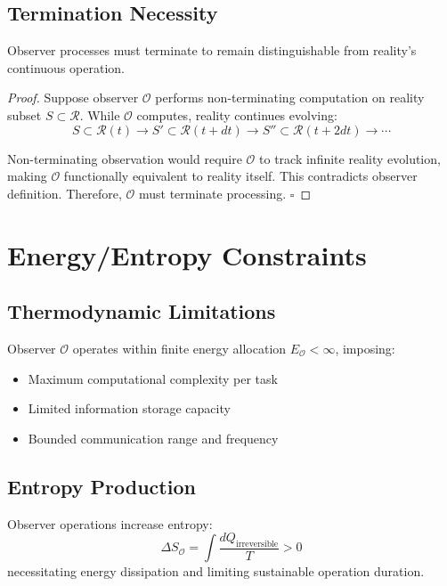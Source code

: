 \documentclass{article}
\begin{document}
\subsection{Termination Necessity}
\begin{theorem}
Observer processes must terminate to remain distinguishable from reality's continuous operation.
\end{theorem}

\begin{proof}
Suppose observer $\mathcal{O}$ performs non-terminating computation on reality subset $S \subset \mathcal{R}$. While $\mathcal{O}$ computes, reality continues evolving:
$$S \subset \mathcal{R}(t) \rightarrow S' \subset \mathcal{R}(t + dt) \rightarrow S'' \subset \mathcal{R}(t + 2dt) \rightarrow \cdots$$

Non-terminating observation would require $\mathcal{O}$ to track infinite reality evolution, making $\mathcal{O}$ functionally equivalent to reality itself. This contradicts observer definition. Therefore, $\mathcal{O}$ must terminate processing. $\square$
\end{proof}

\section{Energy/Entropy Constraints}

\subsection{Thermodynamic Limitations}
\begin{definition}
Observer $\mathcal{O}$ operates within finite energy allocation $E_{\mathcal{O}} < \infty$, imposing:
\begin{itemize}
    \item Maximum computational complexity per task
    \item Limited information storage capacity
    \item Bounded communication range and frequency
\end{itemize}
\end{definition}

\subsection{Entropy Production}
Observer operations increase entropy:
$$\Delta S_{\mathcal{O}} = \int \frac{dQ_{\text{irreversible}}}{T} > 0$$
necessitating energy dissipation and limiting sustainable operation duration.
\end{document}
